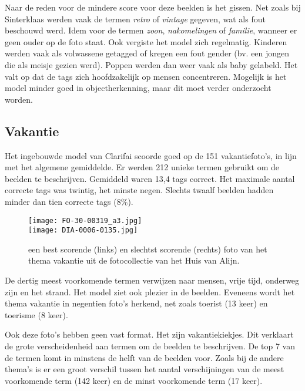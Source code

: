 Naar de reden voor de mindere score voor deze beelden is het gissen. Net zoals bij Sinterklaas werden vaak de termen \textit{retro} of \textit{vintage} gegeven, wat als fout beschouwd werd. Idem voor de termen \textit{zoon}, \textit{nakomelingen} of \textit{familie}, wanneer er geen ouder op de foto staat. Ook vergiste het model zich regelmatig. Kinderen werden vaak als volwassene getagged of kregen een fout gender (bv. een jongen die als meisje gezien werd). Poppen werden dan weer vaak als baby gelabeld. Het valt op dat de tags zich hoofdzakelijk op mensen concentreren. Mogelijk is het model minder goed in objectherkenning, maar dit moet verder onderzocht worden.

\subsection{Vakantie}

Het ingebouwde model van Clarifai scoorde goed op de 151 vakantiefoto’s, in lijn met het algemene gemiddelde.  Er werden 212 unieke termen gebruikt om de beelden te beschrijven. Gemiddeld waren 13,4 tags correct. Het maximale aantal correcte tags was twintig, het minste negen. Slechts twaalf beelden hadden minder dan tien correcte tags (8\%).

\begin{figure}
	\centering
	\texttt{[image: FO-30-00319\_a3.jpg]}\hfill
	\\[\smallskipamount]
	\texttt{[image: DIA-0006-0135.jpg]}\hfill
	\caption[Best en slechtst scorende foto van thema vakantie]{een best scorende (links) en slechtst scorende (rechts) foto van het thema vakantie uit de fotocollectie van het Huis van Alijn.}
\end{figure}

De dertig meest voorkomende termen verwijzen naar mensen, vrije tijd, onderweg zijn en het strand. Het model ziet ook plezier in de beelden. Eveneens wordt het thema vakantie in negentien foto’s herkend, net zoals toerist (13 keer) en toerisme (8 keer).

Ook deze foto’s hebben geen vast format. Het zijn vakantiekiekjes. Dit verklaart de grote verscheidenheid aan termen om de beelden te beschrijven. De top 7 van de termen komt in minstens de helft van de beelden voor. Zoals bij de andere thema’s is er een groot verschil tussen het aantal verschijningen van de meest voorkomende term (142 keer) en de minst voorkomende term (17 keer). 

